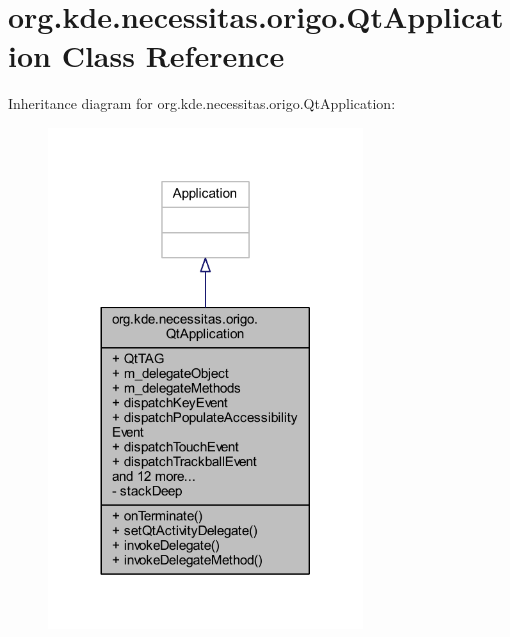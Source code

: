 \hypertarget{classorg_1_1kde_1_1necessitas_1_1origo_1_1_qt_application}{\section{org.\-kde.\-necessitas.\-origo.\-Qt\-Application Class Reference}
\label{d0/da0/classorg_1_1kde_1_1necessitas_1_1origo_1_1_qt_application}
}


Inheritance diagram for org.\-kde.\-necessitas.\-origo.\-Qt\-Application\-:\nopagebreak
\begin{figure}[H]
\begin{center}
\leavevmode
\includegraphics[width=236pt]{d1/d2a/classorg_1_1kde_1_1necessitas_1_1origo_1_1_qt_application__inherit__graph}
\end{center}
\end{figure}


